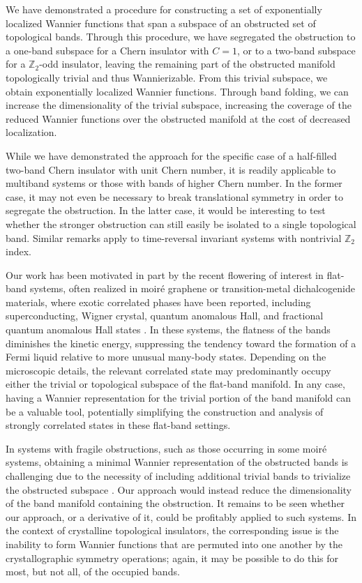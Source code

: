 \documentclass[galley,aps,pra,10pt,amsmath,amssymb,
    superscriptaddress,nofootinbib,longbibliography]{revtex4-2}
\begin{document}
We have demonstrated a procedure for constructing a set of exponentially localized Wannier functions that span a subspace of an obstructed set of topological bands. Through this procedure, we have segregated the obstruction to a one-band subspace for a Chern insulator with $C=1$, or to a two-band subspace for a $\mathbb{Z}_2$-odd insulator, leaving the remaining part of the obstructed manifold topologically trivial and thus Wannierizable. From this trivial subspace, we obtain exponentially localized Wannier functions. Through band folding, we can increase the dimensionality of the trivial subspace, increasing the coverage of the reduced Wannier functions over the obstructed manifold at the cost of decreased localization. 

While we have demonstrated the approach for the specific case of a half-filled two-band Chern insulator with unit Chern number, it is readily applicable to multiband systems or those with bands of higher Chern number. In the former case, it may not even be necessary to break translational symmetry in order to segregate the obstruction. In the latter case, it would be interesting to test whether the stronger obstruction can still easily be isolated to a single topological band. Similar remarks apply to time-reversal invariant systems with nontrivial $\mathbb{Z}_2$ index.

Our work has been motivated in part by the recent flowering of interest in flat-band systems, often realized in moiré graphene or transition-metal dichalcogenide materials, where exotic correlated phases have been reported, including superconducting, Wigner crystal, quantum anomalous Hall, and fractional quantum anomalous Hall states \cite{Shayegan2022, siddharth2013, yang2024, zhao2012, kato2022, wu2007, Jaworowski2018, sheng2011}. In these systems, the flatness of the bands diminishes the kinetic energy, suppressing the tendency toward the formation of a Fermi liquid relative to more unusual many-body states. Depending on the microscopic details, the relevant correlated state may predominantly occupy either the trivial or topological subspace of the flat-band manifold. In any case, having a Wannier representation for the trivial portion of the band manifold can be a valuable tool, potentially simplifying the construction and analysis of strongly correlated states in these flat-band settings.

In systems with fragile obstructions, such as those occurring in some moir\'e systems, obtaining a minimal Wannier representation of the obstructed bands is challenging due to the necessity of including additional trivial bands to trivialize the obstructed subspace \cite{po2019}. Our approach would instead reduce the dimensionality of the band manifold containing the obstruction. It remains to be seen whether our approach, or a derivative of it, could be profitably applied to such systems. In the context of crystalline topological insulators, the corresponding issue is the inability to form Wannier functions that are permuted into one another by the crystallographic symmetry operations; again, it may be possible to do this for most, but not all, of the occupied bands.
\end{document}
